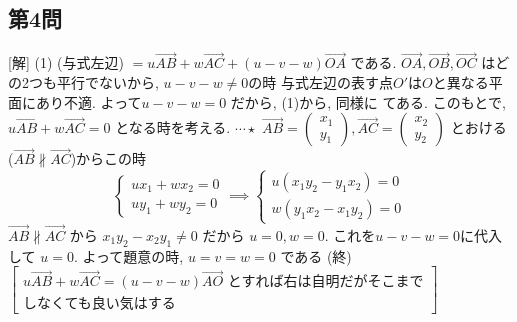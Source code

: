 \documentclass[../main.tex]{subfiles}
\begin{document}
\begin{center}
\end{center}

\subsection*{第4問}
[解] (1) (与式左辺) $= u \overrightarrow{AB} + w \overrightarrow{AC} + (u-v-w) \overrightarrow{OA}$ である.
$\overrightarrow{OA}, \overrightarrow{OB}, \overrightarrow{OC}$ はどの2つも平行でないから, $u-v-w \neq 0$の時
与式左辺の表す点$O'$は$O$と異なる平面にあり不適. よって$u-v-w = 0$ だから, (1)から, 同様に
てある. このもとで, $u \overrightarrow{AB} + w \overrightarrow{AC} = 0$ となる時を考える. $\cdots \star$
$\overrightarrow{AB} =
\begin{pmatrix} x_1 \\ y_1
\end{pmatrix}, \overrightarrow{AC} =
\begin{pmatrix} x_2 \\ y_2
\end{pmatrix}$ とおける($\overrightarrow{AB} \not\parallel \overrightarrow{AC}$)からこの時
$$
\begin{cases}
  u x_1 + w x_2 = 0 \\
  u y_1 + w y_2 = 0
\end{cases}
\implies
\begin{cases}
  u (x_1 y_2 - y_1 x_2) = 0 \\
  w (y_1 x_2 - x_1 y_2) = 0
\end{cases}
$$
$\overrightarrow{AB} \not\parallel \overrightarrow{AC}$ から $x_1 y_2 - x_2 y_1 \neq 0$ だから $u=0, w=0$. これを$u-v-w=0$に代入して $u=0$. よって題意の時, $u=v=w=0$ である (終)
$\left[
  \begin{array}{l} u \overrightarrow{AB} + w \overrightarrow{AC} = (u-v-w) \overrightarrow{AO} \text{ とすれば右は自明だがそこまで} \\ \text{しなくても良い気はする}
\end{array}\right]$
\end{document}
